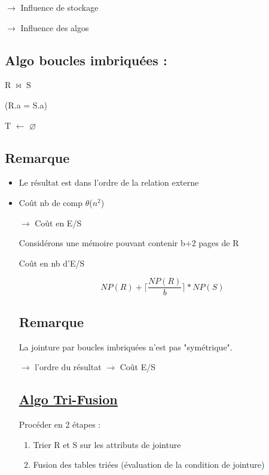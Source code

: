 \documentclass{article}
\begin{document}
$\rightarrow$ Influence de stockage

$\rightarrow$ Influence des algos

\subsection*{Algo boucles imbriquées :}  
R $\bowtie$ S             

(R.a = S.a)

\begin{algorithm}

T $\leftarrow$ $\varnothing$
\end{algorithm}

\subsection*{Remarque}
\begin{itemize} 
	\item Le résultat est dans l'ordre de la relation externe
	\item Coût nb de comp $\theta$($n^{2}$)

$\rightarrow$ Coût en E/S

Considérons une mémoire pouvant contenir b+2 pages de R

Coût en nb d'E/S

\[NP(R) + \lceil\frac{NP(R)}{b}\rceil * NP(S)\]

\subsection*{Remarque}

La jointure par boucles imbriquées n'est pas "symétrique".

$\rightarrow$ l'ordre du résultat
$\rightarrow$ Coût E/S

\subsection*{\underline{Algo Tri-Fusion}}

Procéder en 2 étapes :

\begin{enumerate}
	\item Trier R et S sur les attributs de jointure
	\item Fusion des tables triées (évaluation de la condition de jointure)
\end{enumerate}
\end{itemize}
	
\end{document}

